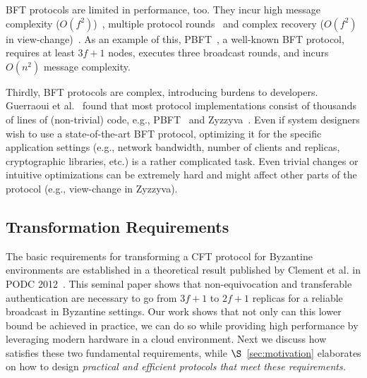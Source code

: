 BFT protocols are limited in performance, too. They incur high message complexity ($O(f^2)$)~\cite{10.1145/2168836.2168866, Castro:2002, minBFT}, multiple protocol rounds~\cite{DBLP:journals/corr/LiuLKA16a, 10.1145/2168836.2168866, Castro:2002, DBLP:journals/corr/abs-1803-05069, yandamuri} and complex recovery ($O(f^2)$ in view-change)~\cite{DBLP:journals/corr/LiuLKA16a, Castro:2002, minBFT, 10.1145/2168836.2168866}. As an example of this, PBFT~\cite{Castro:2002}, a well-known BFT protocol, requires at least $3f+1$ nodes, executes three broadcast rounds, and incurs $O(n^2)$ message complexity. %



Thirdly, BFT protocols are complex, introducing burdens to developers. Guerraoui et al.~\cite{10.1145/2658994} found that most protocol implementations consist of thousands of lines of (non-trivial) code, e.g., PBFT~\cite{Castro:2002} and Zyzzyva~\cite{10.1145/1658357.1658358}. Even if system designers wish to use a state-of-the-art BFT protocol, optimizing it for the specific application settings (e.g., network bandwidth,  number of clients and replicas, cryptographic libraries, etc.) is a rather complicated task.  Even trivial changes or intuitive optimizations can be extremely hard and might affect other parts of the protocol (e.g., view-change in Zyzzyva).





\subsection{Transformation Requirements}
\label{subsec:req}

The basic requirements for transforming a CFT protocol for Byzantine environments are established in a theoretical result published by Clement et al. in PODC 2012~\cite{clement2012}. This seminal paper shows that non-equivocation and transferable authentication are necessary to go from $3f+1$ to $2f+1$ replicas for a reliable broadcast in Byzantine settings. Our work shows that not only can this lower bound be achieved in practice, we can do so while providing high performance by leveraging modern hardware in a cloud environment. Next we discuss how \projecttitle{} satisfies these two fundamental requirements, while $\S$~\ref{sec:motivation} elaborates on how to design \em{practical} and \em{efficient} protocols that meet these requirements.



